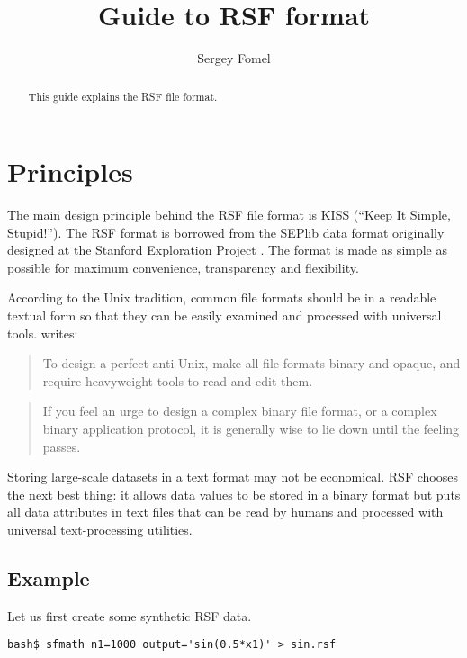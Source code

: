 \title{Guide to RSF format}
\author{Sergey Fomel}

\maketitle

\begin{abstract}

  This guide explains the RSF file format.

\end{abstract}

\section{Principles}

The main design principle behind the RSF file format is KISS (``Keep It
Simple, Stupid!''). The RSF format is borrowed from the SEPlib data format
originally designed at the Stanford Exploration Project
\cite[]{Claerbout.sep.70.413}. The format is made as simple as possible for
maximum convenience, transparency and flexibility.

According to the Unix tradition, common file formats should be in a readable
textual form so that they can be easily examined and processed with universal
tools.  \cite{taoup} writes:
\begin{quote}
  To design a perfect anti-Unix, make all file formats binary and opaque, and
  require heavyweight tools to read and edit them.
\end{quote}
\begin{quote}
  If you feel an urge to design a complex binary file format, or a complex
  binary application protocol, it is generally wise to lie down until the
  feeling passes.
\end{quote}

Storing large-scale datasets in a text format may not be economical. RSF
chooses the next best thing: it allows data values to be stored in a binary
format but puts all data attributes in text files that can be read by humans
and processed with universal text-processing utilities.

\subsection{Example}

Let us first create some synthetic RSF data.
\begin{verbatim}
bash$ sfmath n1=1000 output='sin(0.5*x1)' > sin.rsf
\end{verbatim}

